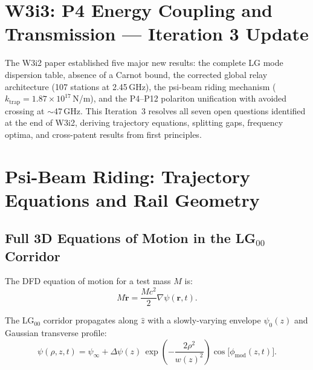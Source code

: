\documentclass[aps,prd,twocolumn,superscriptaddress]{revtex4-2}
\begin{document}
\maketitle

\section*{W3i3: P4 Energy Coupling and Transmission --- Iteration 3 Update}
\label{sec:intro}

The W3i2 paper established five major new results: the complete LG
mode dispersion table, absence of a Carnot bound, the corrected global
relay architecture (107 stations at 2.45\,GHz), the psi-beam riding
mechanism ($k_\mathrm{trap} = 1.87\times10^{17}$\,N/m), and the P4--P12
polariton unification with avoided crossing at $\sim$47\,GHz.  This
Iteration~3 resolves all seven open questions identified at the end
of W3i2, deriving trajectory equations, splitting gaps, frequency
optima, and cross-patent results from first principles.

\section{Psi-Beam Riding: Trajectory Equations and Rail Geometry}
\label{sec:trajectories}

\subsection{Full 3D Equations of Motion in the LG$_{00}$ Corridor}

The DFD equation of motion for a test mass $M$ is:
\begin{equation}
M\ddot{\mathbf{r}} = \frac{Mc^2}{2}\nabla\psi(\mathbf{r},t).
\label{eq:eom_full}
\end{equation}

The LG$_{00}$ corridor propagates along $\hat{z}$ with a slowly-varying
envelope $\psi_0(z)$ and Gaussian transverse profile:
\begin{equation}
\psi(\rho,z,t) = \psi_\infty + \Delta\psi(z)\,\exp\!\left(-\frac{2\rho^2}{w(z)^2}\right)
\cos\!\bigl[\phi_\mathrm{mod}(z,t)\bigr].
\label{eq:psi_profile}
\end{equation}
\end{document}
